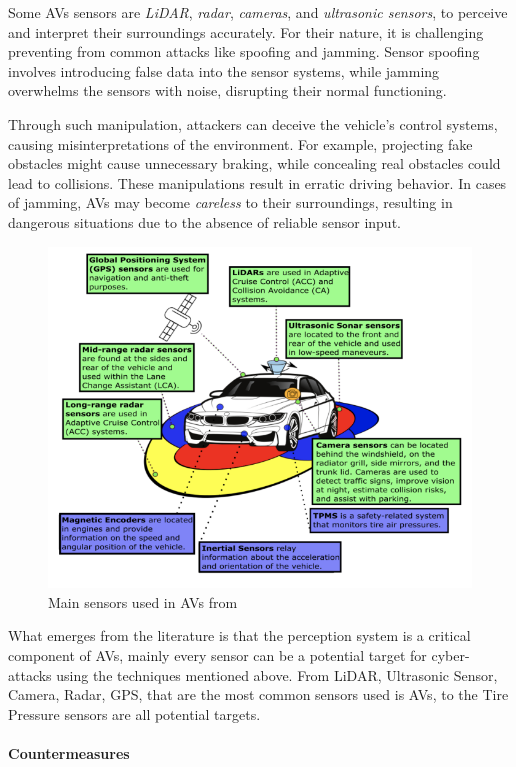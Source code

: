 Some AVs sensors are \textit{LiDAR}, \textit{radar}, \textit{cameras}, and \textit{ultrasonic sensors}, to perceive and interpret their surroundings accurately.
For their nature, it is challenging preventing from common attacks like spoofing and jamming.
Sensor spoofing involves introducing false data into the sensor systems, while jamming overwhelms the sensors with noise, disrupting their normal functioning.

Through such manipulation, attackers can deceive the vehicle's control systems, causing misinterpretations of the environment.
For example, projecting fake obstacles might cause unnecessary braking, while concealing real obstacles could lead to collisions.
These manipulations result in erratic driving behavior.
In cases of jamming, AVs may become \textit{careless} to their surroundings, resulting in dangerous situations due to the absence of reliable sensor input\cite{durlik2022cybersecurity}.

\begin{figure}[!htb]
    \centering
    \includegraphics[width=0.7\linewidth]{figures/sensors}
    \caption{Main sensors used in AVs from \cite{sensors}}
    \label{fig:sensors-2}
\end{figure}

What emerges from the literature is that the perception system is a critical component of AVs, mainly every sensor can be a potential target for cyber-attacks using the techniques mentioned above.
From LiDAR, Ultrasonic Sensor, Camera, Radar, GPS, that are the most common sensors used is AVs, to the Tire Pressure sensors are all potential targets\cite{sensors}.


\paragraph{Countermeasures}

